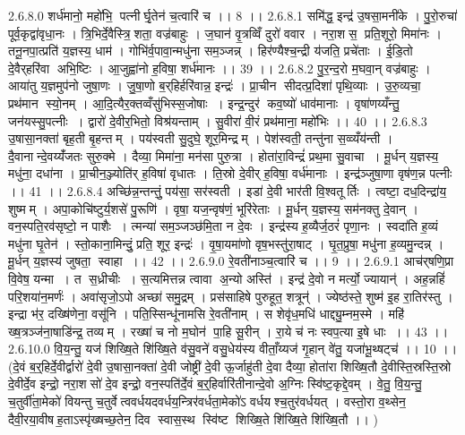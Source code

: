 2.6.8.0
शर्ध॑मानो॒ महो॑भि॒ पत्नीर्घृ॒तेन॑ च॒त्वारि॑ च ।। 8 ।।
2.6.8.1
समि॑द्ध॒ इन्द्र॑ उ॒षसा॒मनी॑के । पु॒रो॒रुचा॑ पूर्व॒कृद्वा॑वृधा॒नः । त्रि॒भिर्दे॒वैस्त्रि॒॒शता॒ वज्र॑बाहुः । ज॒घान॑ वृ॒त्रव्विँ दुरो॑ ववार । नरा॒शस॒ प्रति॒शूरो॒ मिमा॑नः । तनू॒नपा॒त्प्रति॑ य॒ज्ञस्य॒ धाम॑ । गोभि॑र्व॒पावा॒न्मधु॑ना सम॒ञ्जन्न् । हिर॑ण्यैश्च॒न्द्री य॑जति॒ प्रचे॑ताः । ई॒डि॒तो दे॒वैर्‌हरि॑वा अभि॒ष्टिः । आ॒जुह्वा॑नो ह॒विषा॒ शर्ध॑मानः ।। 39 ।।
2.6.8.2
पु॒र॒न्द॒रो म॒घवा॒न् वज्र॑बाहुः । आया॑तु य॒ज्ञमुप॑नो जुषा॒णः । जु॒षा॒णो ब॒र्‌हिर्हरि॑वान्न॒ इन्द्रः॑ । प्रा॒चीन॑ सीदत्प्र॒दिशा॑ पृथि॒व्याः । उ॒रु॒व्यचा॒ प्रथ॑मान स्यो॒नम् । आ॒दि॒त्यैर॒क्तव्वँसु॑भिस्स॒जोषाः । इन्द्र॒न्दुर॑ कव॒ष्यो॑ धाव॑मानाः । वृषा॑णय्यँन्तु॒ जन॑यस्सु॒पत्नीः । द्वारो॑ दे॒वीर॒भितो॒ विश्र॑यन्ताम् । सु॒वीरा॑ वी॒रं प्रथ॑माना॒ महो॑भिः ।। 40 ।।
2.6.8.3
उ॒षासा॒नक्ता॑ बृह॒ती बृ॒हन्तम् । पय॑स्वती सु॒दुघे॒ शूर॒मिन्द्रम् । पेश॑स्वती॒ तन्तु॑ना स॒व्व्यँय॑न्ती । दै॒वानान्दे॒वय्यँ॑जतः सुरु॒क्मे । दैव्या॒ मिमा॑ना॒ मन॑सा पुरु॒त्रा । होता॑रा॒विन्द्रं॑ प्रथ॒मा सु॒वाचा । मू॒र्धन् य॒ज्ञस्य॒ मधु॑ना॒ दधा॑ना । प्रा॒चीन॒ञ्ज्योति॑र् ह॒विषा॑ वृधातः । ति॒स्रो दे॒वीर्‌ ह॒विषा॒ वर्ध॑मानाः । इन्द्र॑ञ्जुषा॒णा वृष॑ण॒न्न पत्नीः ।। 41 ।।
2.6.8.4
अच्छि॑न्न॒न्तन्तुं॒ पय॑सा॒ सर॑स्वती । इडा॑ दे॒वी भार॑ती वि॒श्वतूर्तिः । त्वष्टा॒ दध॒दिन्द्रा॑य॒ शुष्मम् । अपा॒कोचि॑ष्टुर्य॒शसे॑ पु॒रूणि॑ । वृषा॒ यज॒न्वृष॑णं॒ भूरि॑रेताः । मू॒र्धन् य॒ज्ञस्य॒ सम॑नक्तु दे॒वान् । वन॒स्पति॒रव॑सृष्टो॒ न पाशैः । त्मन्या॑ सम॒ञ्जञ्छ॑मि॒ता न दे॒वः । इन्द्र॑स्य ह॒व्यैर्ज॒ठरं॑ पृणा॒नः । स्वदा॑ति ह॒व्यं मधु॑ना घृ॒तेन॑ । स्तो॒काना॒मिन्दुं॒ प्रति॒ शूर॒ इन्द्रः॑ । वृ॒षा॒यमा॑णो वृष॒भस्तु॑रा॒षाट् । घृ॒त॒प्रुषा॒ मधु॑ना ह॒व्यमु॒न्दन्न् । मू॒र्धन् य॒ज्ञस्य॑ जुषता॒॒ स्वाहा ।। 42 ।।
2.6.9.0
रे॒वती॑नाञ्च॒त्वारि॑ च ।। 9 ।।
2.6.9.1
आच॑र्‌षणि॒प्रा वि॒वेष॒ यन्मा । त स॒ध्रीचीः । स॒त्यमित्तन्न त्वावा॑ अ॒न्यो अस्ति॑ । इन्द्र॑ दे॒वो न मर्त्यो॒ ज्यायान्॑ । अह॒न्नहिं॑ परि॒शया॑न॒मर्णः॑ । अवा॑सृजो॒ऽपो अच्छा॑ समु॒द्रम् । प्रस॑साहिषे पुरुहूत॒ शत्रून्॑ । ज्येष्ठ॑स्ते॒ शुष्म॑ इ॒ह रा॒तिर॑स्तु । इन्द्रा भ॑र॒ दख्षि॑णेना॒ वसू॑नि । पति॒स्सिन्धू॑नामसि रे॒वती॑नाम् । स शेवृ॑ध॒मधि॑ धाद्द्यु॒म्नम॒स्मे । महि॑ ख्ष॒त्रञ्ज॑ना॒षाडि॑न्द्र॒ तव्यम् । रख्षा॑ च नो म॒घोन॑ पा॒हि सू॒रीन् । रा॒ये च॑ नः स्वप॒त्या इ॒षे धाः ।। 43 ।।
2.6.10.0
वि॒य॒न्तु॒ यज॑ शिख्षि॒ते शि॑ख्षि॒ते व॑सु॒वने॑ वसु॒धेय॑स्य वीताँ॒य्यज॑ गृ॒हान् वे॑तु॒ यजा॑भू॒थ्षट्च॑ ।। 10 ।। (दे॒वं ब॒र्॒हिर्दे॒वीर्द्वारो॑ दे॒वी उ॒षासा॒नक्ता॑ दे॒वी जोष्ट्री॑ दे॒वी ऊ॒र्जाहु॑ती दे॒वा दैव्या॒ होता॑रा शिख्षि॒तौ दे॒वीस्ति॒स्रस्ति॒स्रो दे॒वीर्दे॒व इन्द्रो॒ नरा॒शसो॑ दे॒व इन्द्रो॒ वन॒स्पति॑र्दे॒वं ब॒र्॒हिर्वारि॑तीनान्दे॒वो अ॒ग्निः स्वि॑ष्ट॒कृद्दे॒वम् । वे॒तु॒ वि॒य॒न्तु॒ च॒तुर्वी॑ता॒मेको॑ वियन्तु च॒तुर्वेत्ववर्धयदवर्धय॒न्त्रिर॑वर्धता॒मेको॑ऽ वर्धयश्च॒तुर॑वर्धयत् । वस्तो॒रा व॒थ्सेन॒ दैवी॒रया॒वीष॑ह॒ताऽस्पृ॑ख्षच्छ॒तेन॒ दिव॑ स्वास॒स्थ स्वि॑ष्ट शिख्षि॒ते शि॑ख्षि॒ते शि॑ख्षि॒तौ ।। )
